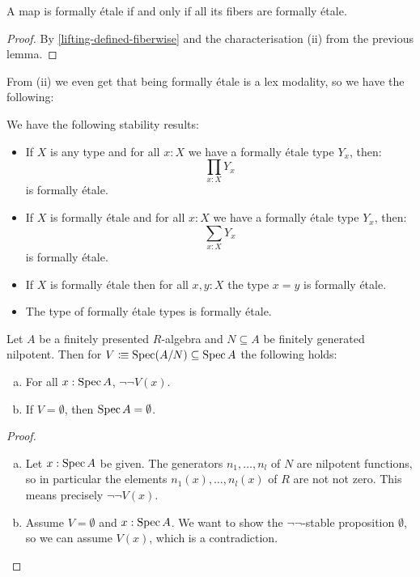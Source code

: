\begin{lemma}
A map is formally étale if and only if all its fibers are formally étale.
\end{lemma}

\begin{proof}
By \cref{lifting-defined-fiberwise} and the characterisation (ii) from the previous lemma.
\end{proof}

From (ii) we even get that being formally étale is a lex modality, so we have the following:

\begin{proposition}
We have the following stability results:
\begin{itemize}
\item If $X$ is any type and for all $x:X$ we have a formally étale type $Y_x$, then:
\[\prod_{x:X}Y_x\]
is formally étale. 
\item  If $X$ is formally étale and for all $x:X$ we have a formally étale type $Y_x$, then:
\[\sum_{x:X}Y_x\]
is formally étale. 
\item If $X$ is formally étale then for all $x,y : X$ the type $x=y$ is formally étale.
\item The type of formally étale types is formally étale.
\end{itemize}
\end{proposition}

\begin{lemma}%
  \label{nilpotent-ideal-not-not-dense}
  Let $A$ be a finitely presented $R$-algebra and $N\subseteq A$ be finitely generated nilpotent.
  Then for $V\vcentcolon\mspace{-1.2mu}\equiv \operatorname{Spec} (A/N)\subseteq \operatorname{Spec} A$ the following holds:
  \begin{enumerate}[(a)]
  \item For all $x:\operatorname{Spec} A$, $\neg\neg V(x)$.
  \item If $V=\emptyset$, then $\operatorname{Spec} A=\emptyset$.
  \end{enumerate}
\end{lemma}

\begin{proof}
  \begin{enumerate}[(a)]
  \item
    Let $x : \operatorname{Spec} A$ be given.
    The generators $n_1,\dots,n_l$ of $N$ are nilpotent functions,
    so in particular the elements $n_1(x), \dots, n_l(x)$ of $R$
    are not not zero.
    This means precisely $\neg\neg V(x)$.
  \item Assume $V=\emptyset$ and $x:\operatorname{Spec} A$.
        We want to show the $\neg\neg$-stable proposition $\emptyset$,
        so we can assume $V(x)$, which is a contradiction.
  \end{enumerate}
\end{proof}

